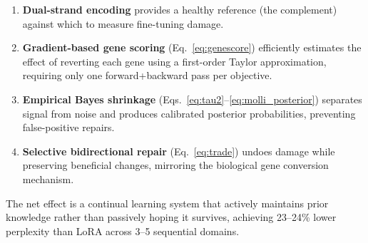 \documentclass[11pt,letterpaper]{article}
\theoremstyle{definition}
\begin{document}
\begin{enumerate}
  \item \textbf{Dual-strand encoding} provides a healthy reference (the complement) against which to measure fine-tuning damage.
  \item \textbf{Gradient-based gene scoring} (Eq.~\ref{eq:genescore}) efficiently estimates the effect of reverting each gene using a first-order Taylor approximation, requiring only one forward+backward pass per objective.
  \item \textbf{Empirical Bayes shrinkage} (Eqs.~\ref{eq:tau2}--\ref{eq:molli_posterior}) separates signal from noise and produces calibrated posterior probabilities, preventing false-positive repairs.
  \item \textbf{Selective bidirectional repair} (Eq.~\ref{eq:trade}) undoes damage while preserving beneficial changes, mirroring the biological gene conversion mechanism.
\end{enumerate}

The net effect is a continual learning system that actively maintains prior knowledge rather than passively hoping it survives, achieving 23--24\% lower perplexity than LoRA across 3--5 sequential domains.
\end{document}
